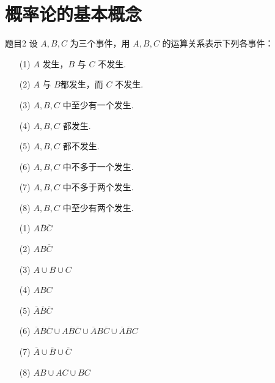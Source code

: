 \section{概率论的基本概念}

\begin{question}{题目2}
    设 $A,B,C$ 为三个事件，用 $A,B,C$ 的运算关系表示下列各事件：
    \begin{itemize}
        \item[(1)] $A$ 发生，$B$ 与 $C$ 不发生.
        \item[(2)] $A$ 与 $B$都发生，而 $C$ 不发生.
        \item[(3)] $A,B,C$ 中至少有一个发生.
        \item[(4)] $A,B,C$ 都发生.
        \item[(5)] $A,B,C$ 都不发生.
        \item[(6)] $A,B,C$ 中不多于一个发生.
        \item[(7)] $A,B,C$ 中不多于两个发生.
        \item[(8)] $A,B,C$ 中至少有两个发生.
    \end{itemize}
\end{question}
\begin{solution}
    \begin{itemize}
        \item[(1)] $A\overline{B}\overline{C}$
        \item[(2)] $AB\overline{C}$
        \item[(3)] $A \cup B \cup C$
        \item[(4)] $ABC$
        \item[(5)] $\overline{A}\overline{B}\overline{C}$
        \item[(6)] $\overline{A}\overline{B}\overline{C} \cup A\overline{B}\overline{C} \cup \overline{A}B\overline{C} \cup \overline{A}\overline{B}C$
        \item[(7)] $\overline{A}\cup\overline{B}\cup\overline{C}$
        \item[(8)] $AB \cup AC \cup BC$ %
    \end{itemize}
\end{solution}



